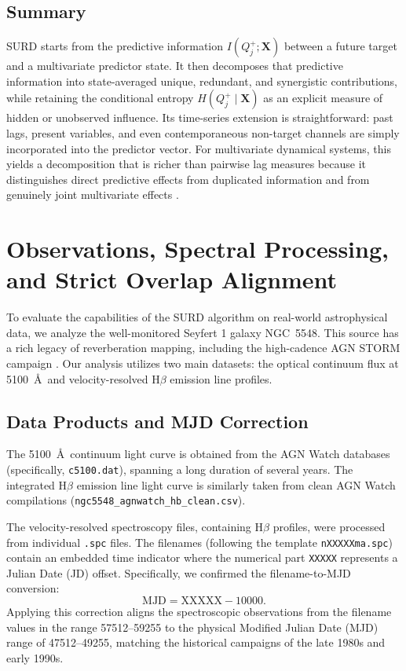 \documentclass[12pt, a4paper]{article}
\begin{document}
\subsection{Summary}

SURD starts from the predictive information \(I(Q_j^+;\mathbf{X})\) between a future target and a multivariate predictor state. It then decomposes that predictive information into state-averaged unique, redundant, and synergistic contributions, while retaining the conditional entropy \(H(Q_j^+\mid \mathbf{X})\) as an explicit measure of hidden or unobserved influence. Its time-series extension is straightforward: past lags, present variables, and even contemporaneous non-target channels are simply incorporated into the predictor vector. For multivariate dynamical systems, this yields a decomposition that is richer than pairwise lag measures because it distinguishes direct predictive effects from duplicated information and from genuinely joint multivariate effects \cite{MartinezSanchez2024SURD,WilliamsBeer2010}.

\section{Observations, Spectral Processing, and Strict Overlap Alignment}
\label{sec:data_processing}

To evaluate the capabilities of the SURD algorithm on real-world astrophysical data, we analyze the well-monitored Seyfert 1 galaxy NGC~5548. This source has a rich legacy of reverberation mapping, including the high-cadence AGN STORM campaign \cite{DeRosa2015,Pei2017}. Our analysis utilizes two main datasets: the optical continuum flux at 5100~\AA\ and velocity-resolved H\(\beta\) emission line profiles.

\subsection{Data Products and MJD Correction}

The 5100~\AA\ continuum light curve is obtained from the AGN Watch databases (specifically, \texttt{c5100.dat}), spanning a long duration of several years. The integrated H\(\beta\) emission line light curve is similarly taken from clean AGN Watch compilations (\texttt{ngc5548\_agnwatch\_hb\_clean.csv}).

The velocity-resolved spectroscopy files, containing H\(\beta\) profiles, were processed from individual \texttt{.spc} files. The filenames (following the template \texttt{nXXXXXma.spc}) contain an embedded time indicator where the numerical part \texttt{XXXXX} represents a Julian Date (JD) offset. Specifically, we confirmed the filename-to-MJD conversion:
\begin{equation}
\mathrm{MJD} = \mathrm{XXXXX} - 10000.
\end{equation}
Applying this correction aligns the spectroscopic observations from the filename values in the range 57512--59255 to the physical Modified Julian Date (MJD) range of 47512--49255, matching the historical campaigns of the late 1980s and early 1990s.
\end{document}
